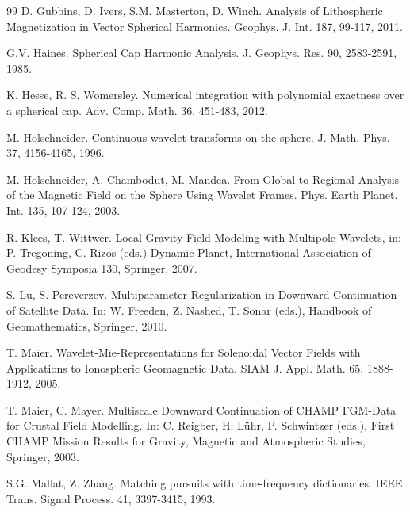 \documentclass[a4paper, 10pt]{article}
\numberwithin{equation}{section}
\theoremstyle{definition}
\begin{document}
\begin{thebibliography}{99}
D. Gubbins, D. Ivers, S.M. Masterton, D. Winch. Analysis of Lithospheric Magnetization in Vector Spherical Harmonics. Geophys. J. Int. 187, 99-117, 2011. 

G.V. Haines. Spherical Cap Harmonic Analysis. J. Geophys. Res. {90}, 2583-2591, 1985.

K. Hesse, R. S. Womersley. Numerical integration with polynomial exactness over a spherical cap. Adv. Comp. Math. 36, 451-483, 2012. 

M. Holschneider. Continuous wavelet transforms on the sphere. J. Math. Phys. 37, 4156-4165, 1996.

M. Holschneider, A. Chambodut, M. Mandea. From Global to Regional Analysis of the Magnetic Field on the Sphere Using Wavelet Frames. Phys. Earth Planet. Int. {135}, 107-124, 2003.



R. Klees, T. Wittwer. Local Gravity Field Modeling with Multipole Wavelets, in: P. Tregoning, C. Rizos (eds.) Dynamic Planet, International Association of Geodesy Symposia {130}, Springer, 2007.

S. Lu, S. Pereverzev. Multiparameter Regularization in Downward Continuation of Satellite Data.  In: W. Freeden, Z. Nashed, T. Sonar (eds.), Handbook of Geomathematics, Springer, 2010.

T. Maier. Wavelet-Mie-Representations for Solenoidal Vector Fields with Applications to Ionospheric Geomagnetic Data. SIAM J. Appl. Math. 65, 1888-1912, 2005. 

T. Maier, C. Mayer. Multiscale Downward Continuation of CHAMP FGM-Data for Crustal Field Modelling. In: C. Reigber, H. L\"uhr, P. Schwintzer (eds.),  First CHAMP Mission Results for Gravity, Magnetic and Atmospheric Studies, Springer, 2003. 

S.G. Mallat, Z. Zhang. Matching pursuits with time-frequency dictionaries. IEEE Trans. Signal Process. 41, 3397-3415, 1993.



\end{thebibliography}
\end{document}
